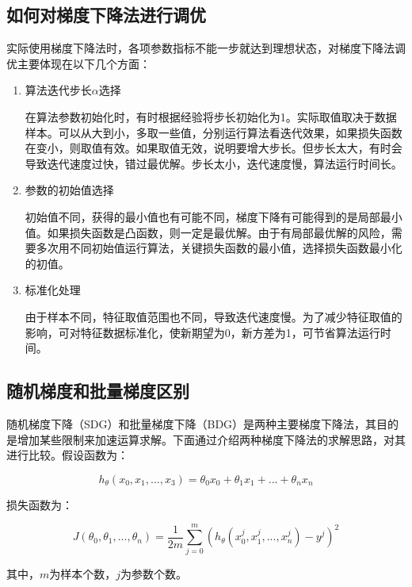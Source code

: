 \subsection{如何对梯度下降法进行调优}

实际使用梯度下降法时，各项参数指标不能一步就达到理想状态，对梯度下降法调优主要体现在以下几个方面：

\begin{enumerate}
\itemsep0em 
\item 算法迭代步长$\alpha$选择

	在算法参数初始化时，有时根据经验将步长初始化为1。实际取值取决于数据样本。可以从大到小，多取一些值，分别运行算法看迭代效果，如果损失函数在变小，则取值有效。如果取值无效，说明要增大步长。但步长太大，有时会导致迭代速度过快，错过最优解。步长太小，迭代速度慢，算法运行时间长。

\item 参数的初始值选择

	初始值不同，获得的最小值也有可能不同，梯度下降有可能得到的是局部最小值。如果损失函数是凸函数，则一定是最优解。由于有局部最优解的风险，需要多次用不同初始值运行算法，关键损失函数的最小值，选择损失函数最小化的初值。

\item 标准化处理

	由于样本不同，特征取值范围也不同，导致迭代速度慢。为了减少特征取值的影响，可对特征数据标准化，使新期望为0，新方差为1，可节省算法运行时间。
\end{enumerate}

\subsection{随机梯度和批量梯度区别}

随机梯度下降（SDG）和批量梯度下降（BDG）是两种主要梯度下降法，其目的是增加某些限制来加速运算求解。下面通过介绍两种梯度下降法的求解思路，对其进行比较。假设函数为：

$$
h_\theta (x_0,x_1,...,x_3) = \theta_0 x_0 + \theta_1 x_1 + ... + \theta_n x_n
$$

损失函数为：

$$
J(\theta_0, \theta_1, ... , \theta_n) = 
			\frac{1}{2m} \sum^{m}_{j=0}(h_\theta (x^{j}_0
	,x^{j}_1,...,x^{j}_n)-y^j)^2
$$

其中，$m$为样本个数，$j$为参数个数。

